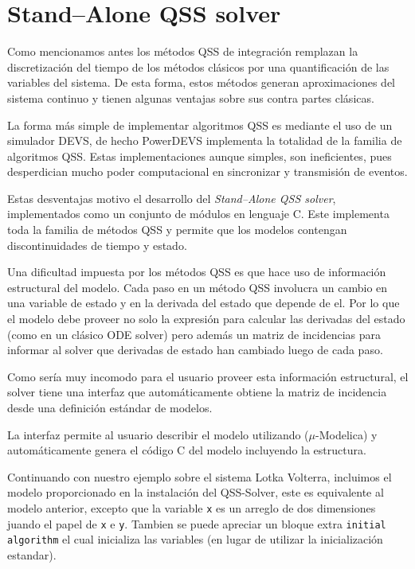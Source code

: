 \section{Stand–Alone QSS solver}
	Como mencionamos antes los métodos QSS de integración remplazan la discretización del tiempo de los métodos clásicos por una quantificación de las 
	variables del sistema. De esta forma, estos métodos generan aproximaciones del sistema continuo y tienen algunas ventajas sobre sus contra partes clásicas.

	La forma más simple de implementar algoritmos QSS es mediante el uso de un simulador DEVS, de hecho PowerDEVS implementa la totalidad de la familia de 
	algoritmos QSS. Estas implementaciones aunque simples, son ineficientes, pues desperdician mucho poder computacional en sincronizar y transmisión de eventos.

	Estas desventajas motivo el desarrollo del \emph{Stand–Alone QSS solver}, implementados como un conjunto de módulos en lenguaje C. Este implementa 
	toda la familia de métodos QSS y permite que los modelos contengan discontinuidades de tiempo y estado.

	Una dificultad impuesta por los métodos QSS es que hace uso de información estructural del modelo. Cada paso en un método QSS involucra un cambio 
	en una variable de estado y en la derivada del estado que depende de el. Por lo que el modelo debe proveer no solo la expresión para calcular las 
	derivadas del estado (como en un clásico ODE solver) pero además un matriz de incidencias para informar al solver que derivadas de estado han cambiado 
	luego de cada paso.

	Como sería muy incomodo para el usuario proveer esta información estructural, el solver tiene una interfaz que automáticamente obtiene la matriz de
	 incidencia desde una definición estándar de modelos.

	La interfaz permite al usuario describir el modelo utilizando ($\mu$-Modelica) y automáticamente genera el código C del modelo incluyendo la estructura.

	Continuando con nuestro ejemplo sobre el sistema Lotka Volterra, incluimos el modelo proporcionado en la instalación del QSS-Solver, este es equivalente 
	al modelo anterior, excepto que la variable \texttt{x} es un arreglo de dos dimensiones juando el papel de \texttt{x} e \texttt{y}.
	Tambien se puede apreciar un bloque extra \texttt{initial algorithm} el cual inicializa las variables (en lugar de utilizar la inicialización estandar).

